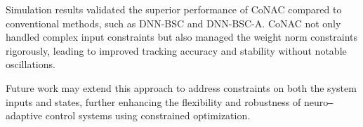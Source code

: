 \documentclass[lettersize,journal]{IEEEtran}
\begin{document}
Simulation results validated the superior performance of CoNAC compared to conventional methods, such as DNN-BSC and DNN-BSC-A. CoNAC not only handled complex input constraints but also managed the weight norm constraints rigorously, leading to improved tracking accuracy and stability without notable oscillations.

Future work may extend this approach to address constraints on both the system inputs and states, further enhancing the flexibility and robustness of neuro‒adaptive control systems using constrained optimization.






\end{document}
